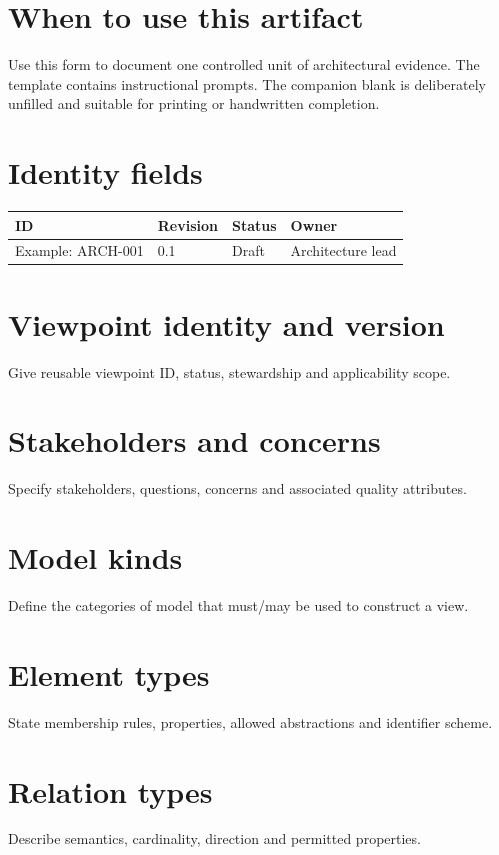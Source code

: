 \documentclass[10pt,letterpaper]{article}
\begin{document}
\DocProvenance
\section{When to use this artifact}
Use this form to document one controlled unit of architectural evidence. The template contains instructional prompts. The companion blank is deliberately unfilled and suitable for printing or handwritten completion.

\section{Identity fields}
\small
\begin{tabularx}{\linewidth}{@{}YYYY@{}}
\toprule
\textbf{ID} & \textbf{Revision} & \textbf{Status} & \textbf{Owner} \\
\midrule
Example: ARCH-001 & 0.1 & Draft & Architecture lead \\
\bottomrule
\end{tabularx}
\normalsize
\section{Viewpoint identity and version}
Give reusable viewpoint ID, status, stewardship and applicability scope.

\section{Stakeholders and concerns}
Specify stakeholders, questions, concerns and associated quality attributes.

\section{Model kinds}
Define the categories of model that must/may be used to construct a view.

\section{Element types}
State membership rules, properties, allowed abstractions and identifier scheme.

\section{Relation types}
Describe semantics, cardinality, direction and permitted properties.
\end{document}
